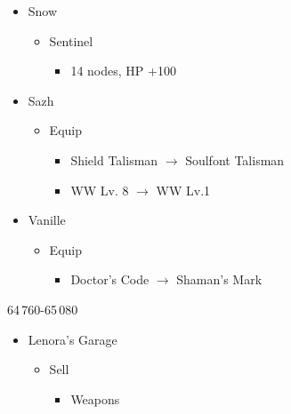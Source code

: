 \begin{multicols}{2}
\begin{menu}
\begin{itemize}
\begin{itemize}
\begin{itemize}
              \end{itemize}
        \item Snow
              \begin{itemize}
                \item Sentinel
                      \begin{itemize}
                        \item 14 nodes, HP +100
                      \end{itemize}
              \end{itemize}
      \end{itemize}
      \equip
      \begin{itemize}
        \item Sazh
              \begin{itemize}
                \item Equip
                      \begin{itemize}
                        \item Shield Talisman $\rightarrow$ Soulfont Talisman
                        \item WW Lv. 8 $\rightarrow$ WW Lv.1
                      \end{itemize}
              \end{itemize}
        \item Vanille
              \begin{itemize}
                \item Equip
                      \begin{itemize}
                        \item Doctor's Code $\rightarrow$ Shaman's Mark
                      \end{itemize}
              \end{itemize}
      \end{itemize}
    \end{itemize}
  \end{menu}
  \begin{shop}{64\,760-65\,080}
    \begin{itemize}
      \item Lenora's Garage
            \begin{itemize}
              \item Sell
                    \begin{itemize}
                      \item Weapons
                            \begin{itemize}

\end{itemize}
\end{itemize}
\end{itemize}
\end{itemize}
\end{shop}
\end{multicols}
